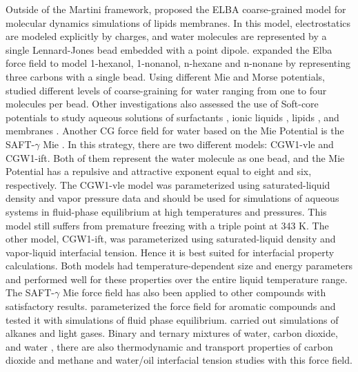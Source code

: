 Outside of the Martini framework,  proposed the ELBA coarse-grained model for molecular dynamics simulations of lipids membranes. In this model, electrostatics are modeled explicitly by charges, and water molecules are represented by a single Lennard-Jones bead embedded with a point dipole.  expanded the Elba force field to model 1-hexanol, 1-nonanol, n-hexane and n-nonane by representing three carbons with a single bead. Using different Mie and Morse potentials,  studied different levels of coarse-graining for water ranging from one to four molecules per bead. Other investigations also assessed the use of Soft-core potentials to study aqueous solutions of surfactants \cite{shinoda2007}, ionic liquids \cite{bhargava2009}, lipids \cite{shinoda20102}, and membranes \cite{pantano2009}. Another CG force field for water based on the Mie Potential is the SAFT-$\gamma$ Mie \cite{lobanova2015}. In this strategy, there are two different models: CGW1-vle and CGW1-ift. Both of them represent the water molecule as one bead, and the Mie Potential has a repulsive and attractive exponent equal to eight and six, respectively. The CGW1-vle model was parameterized using saturated-liquid density and vapor pressure data and should be used for simulations of aqueous systems in fluid-phase equilibrium at high temperatures and pressures. This model still suffers from premature freezing with a triple point at 343 K. The other model, CGW1-ift, was parameterized using saturated-liquid density and vapor-liquid interfacial tension. Hence it is best suited for interfacial property calculations. Both models had temperature-dependent size and energy parameters and performed well for these properties over the entire liquid temperature range. The SAFT-$\gamma$ Mie force field has also been applied to other compounds with satisfactory results.  parameterized the force field for aromatic compounds and tested it with simulations of fluid phase equilibrium.  carried out simulations of alkanes and light gases. Binary and ternary mixtures of water, carbon dioxide, and water \cite{lobanova2016}, there are also thermodynamic and transport properties of carbon dioxide and methane \cite{cassiano1,cassiano2} and water/oil interfacial tension \cite{herdes2017} studies with this force field.  




